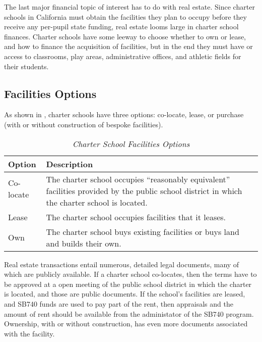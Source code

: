 The last major financial topic of interest has to do with real estate. Since charter schools in California must obtain the facilities they plan to occupy before they receive any per-pupil state funding, real estate looms large in charter school finances. Charter schools have some leeway to choose whether to own or lease, and how to finance the acquisition of facilities, but in the end they must have or access to classrooms, play areas, administrative offices, and athletic fields for their students.

\subsection{Facilities Options}\label{sec:facilities-options}%

As shown in , charter schools have three options: co-locate, lease, or purchase (with or without construction of bespoke facilities).

\begin{table}[ht]
  \centering
  \caption[Charter School Facilities Options]{\textit{Charter School Facilities Options}}%
  \label{tab:charter-facilities-options}%
  \begin{tabularx}{\textwidth}{ll}
    \toprule%
    Option    & Description \\
    \midrule
    Co-locate & \multirow[t]{2}{3.5in}{The charter school occupies ``reasonably equivalent'' facilities provided by 
                the public school district in which the charter school is located.}\vspace{5.5ex}\\\\
    Lease     & The charter school occupies facilities that it leases.\vspace{1ex}\\
    Own       & The charter school buys existing facilities or buys land and builds their own.\\
    \bottomrule%
  \end{tabularx}
\end{table}

Real estate transactions entail numerous, detailed legal documents, many of which are publicly available. If a charter school co-locates, then the terms have to be approved at a open meeting of the public school district in which the charter is located, and those are public documents. If the school's facilities are leased, and SB740 funds are used to pay part of the rent, then appraisals and the amount of rent should be available from the administator of the SB740 program. Ownership, with or without construction, has even more documents associated with the facility.

